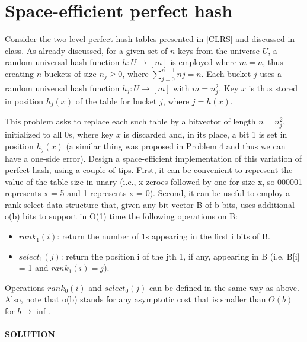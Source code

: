 \documentclass[a4paper]{article}
\begin{document}
\section*{Space-efficient perfect hash}
Consider the two-level perfect hash tables presented in [CLRS] and discussed in class. As already discussed, for a given set of $n$ keys from
the universe $U$, a random universal hash function $h : U \rightarrow [m]$ is employed where $m = n$, thus creating $n$ buckets of size $n_j \geq 0$, where $\sum^{n−1}_{j=0} nj = n$. Each bucket $j$ uses a random universal hash function $h_j: U \rightarrow [m]$ with $m = n_j^2$. Key $x$ is thus stored in
position $h_j (x)$ of the table for bucket $j$, where $j = h(x)$.

This problem asks to replace each such table by a bitvector of length $n=n_j^2$, initialized to all 0s, where key $x$ is discarded and, in its place, a bit 1 is set in position $h_j (x)$ (a similar thing was proposed in Problem 4 and thus we can have a one-side error). Design
a space-efficient implementation of this variation of perfect hash, using a couple of tips. First, it can be convenient to represent the value of the table size in unary (i.e., x zeroes followed by one for size x, so 000001 represents x = 5 and 1 represents x = 0). Second, it can be useful to employ a rank-select data structure that, given any bit vector B of b bits, uses additional o(b) bits to support in O(1) time the following operations on B:
\begin{itemize}
\item $rank_1(i)$: return the number of 1s appearing in the first i bits of B.
\item $select_1(j)$: return the position i of the jth 1, if any, appearing in B (i.e. B[i] = 1 and $rank_1(i) = j$).
\end{itemize}
Operations $rank_0(i)$ and $select_0(j)$ can be defined in the same way as above. Also, note that o(b) stands for any asymptotic cost that is smaller than $\Theta(b)$ for $b \rightarrow \inf$.
\\
\\
\textbf{SOLUTION}
%
\end{document}
